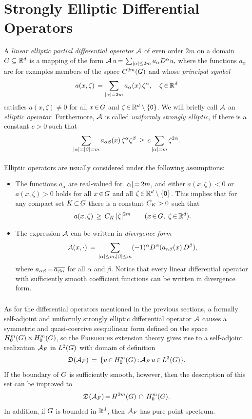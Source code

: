\documentclass[11pt,twoside]{article}
\begin{document}
\section{Strongly Elliptic Differential Operators}
A \textit{linear elliptic partial differential operator} ${\mathcal{A}}$
of even order $2m$ on a domain $G \subseteq {\mathbb{R}}^d$ is a mapping of the form
$
\DO \, u \eq \sum_{\abs{\alpha} \leq 2m} a_{\alpha} D^{\alpha} u,
$
where the functions $a_{\alpha}$ are for examples
members of the space $C^{2m}(G)$ and whose \textit{principal symbol}
\[
a(x,\zeta) \, = \sum_{\abs{\alpha} = 2m} a_{\alpha}(x) \,
\zeta^{\alpha}, \quad \zeta \xeof \Rd
\]
satisfies $a(x,\zeta) \neq 0$ for all $x {\,\in\,} G$ and
$\zeta {\,\in\,} {\mathbb{R}}^d \setminus \{{\mathsf{0}}\}$.
We will briefly call ${\mathcal{A}}$ an \textit{elliptic operator}.
Furthermore,
${\mathcal{A}}$ is called \textit{uniformly strongly elliptic},
if there is a constant $c > 0$ such that
\[
\sum_{\abs{\alpha} = \abs{\beta} = m} a_{\alpha \beta}(x) \,
\zeta^{\alpha} \zeta^{\beta}
\, \geq \,
c \sum_{\abs{\alpha} =m} \zeta^{2 \alpha}.
\]

\paragraph*{}
Elliptic operators are usually considered under the following assumptions:

\begin{itemize}[leftmargin=4mm]
\item[(E-1)]
The functions $a_{\alpha}$ are real-valued for $\abs{\alpha} \eq 2m$,
and either $a(x,\zeta)< 0$ or $a(x,\zeta) > 0$ holds for all $x {\,\in\,} G$
and all $\zeta {\,\in\,} {\mathbb{R}}^d \setminus \{{\mathsf{0}}\}$.
This implies
that for any compact set ${K} {\,\subset\,} G$
there is a constant $C_{{K}} > 0$ such that
\[
a(x,\zeta) \, \geq \, C_{\compK} \, \abs{\zeta} ^{2m}
\quad \quad (x \xeof \G, \; \zeta \xeof \Rd).
\]

\item[(E-2)]
The expression ${\mathcal{A}}$ can be written in \textit{divergence form}
\[
\DO(x,\cdot) \= \sum_{\abs{\alpha} \leq m, \abs{\beta} \leq m}
(-1)^{\alpha} D^{\alpha}(a_{\alpha \beta}(x)\,D^{\beta}),
\]
where $a_{\alpha \beta} {\,=\,} \overline{a_{\beta \alpha}}$
for all $\alpha$ and $\beta$.
Notice that every linear differential operator with sufficiently smooth
coefficient functions can be written in divergence form.
\end{itemize}

\subparagraph*{}
As for the differential operators mentioned in the previous sections,
a formally self-adjoint and uniformly strongly elliptic differential operator
${\mathcal{A}}$ causes a symmetric and quasi-coercive sesquilinear form
defined on the space $H_0^{m}(G) {\,\times\,} H_0^{m}(G)$,
so the \textsc{Friedrichs} extension theory gives rise
to a self-adjoint realization ${\mathcal{A}}_F$ in $L^2(G)$
with domain of definition
\[
\mathfrak{D}({\mathcal{A}}_F) \,=\, \{u {\,\in\,} H_0^{m}(G) {\,:\,} {\mathcal{A}}_F \, u {\,\in\,} L^2(G)\}.
\]
If the boundary of $G$ is sufficiently smooth,
however,
then the description of this set can be improved to
\[
\mathfrak{D}({\mathcal{A}}_F) {\,=\,} H^{2m}(G) \, \cap \, H_0^{m}(G).
\]
In addition,
if $G$ is bounded in ${\mathbb{R}}^d$,
then ${\mathcal{A}}_F$ has pure point spectrum.
\end{document}
